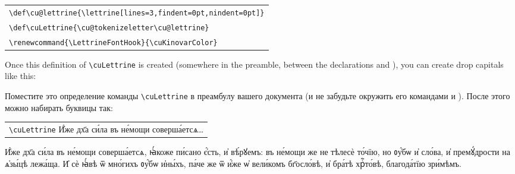 \begin{center}
\begin{churchslavonic}
\begin{tabular}{l}
\verb+\def\cu@lettrine{\lettrine[lines=3,findent=0pt,nindent=0pt]}+\\
\verb+\def\cuLettrine{\cu@tokenizeletter\cu@lettrine}+\\
\verb+\renewcommand{\LettrineFontHook}{\cuKinovarColor}+\\
\end{tabular}
\end{churchslavonic}
\end{center}
%
\begin{EN}
Once this definition of \verb+\cuLettrine+ is created (somewhere in the preamble, between the declarations  and ),
you can create drop capitals like this:
\end{EN}
%
\begin{RU}
Поместите это определение команды \verb+\cuLettrine+ в преамбулу вашего документа (и не забудьте окружить его командами  и ).
После этого можно набирать буквицы так:
\end{RU}
%
\begin{center}
\begin{churchslavonic}
\begin{tabular}{l}
\verb+\cuLettrine+ И҆́же дх҃а си́ла въ не́мощи соверша́етсѧ\ldots\\
\end{tabular}
\end{churchslavonic}
\end{center}

\begin{center}
\begin{churchslavonic}

\parbox{0.75\textwidth}{%
\textwidth

\cuLettrine
И҆́же дх҃а си́ла въ не́мощи соверша́етсѧ, ꙗ҆́коже пи́сано є҆́сть, и҆ вѣ́рꙋемъ: въ не́мощи же не тѣлесѐ то́чїю, но ᲂу҆́бѡ и҆ сло́ва,
и҆ премꙋ́дрости на ѧ҆зы́цѣ лежа́ща. И҆ сѐ ꙗ҆́вѣ ѿ мно́гихъ ᲂу҆́бѡ и҆ны́хъ, па́че же ѿ и҆́же ѡ҆ вели́комъ бг҃осло́вѣ, и҆ бра́тѣ хрⷭ҇то́вѣ,
благода́тїю зри́мѣмъ.
}%
\end{churchslavonic}
\end{center}

